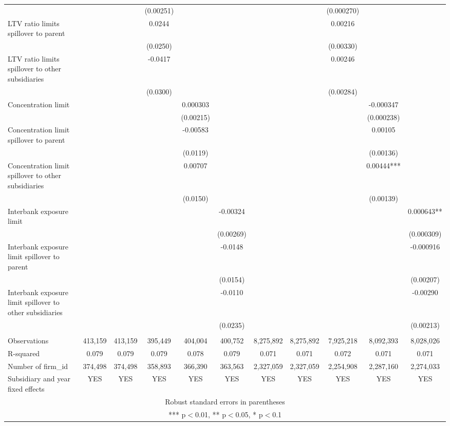 \begin{tabular}{lcccccccccc}
 &  &  & (0.00251) &  &  &  &  & (0.000270) &  &  \\
LTV ratio limits spillover to parent &  &  & 0.0244 &  &  &  &  & 0.00216 &  &  \\
 &  &  & (0.0250) &  &  &  &  & (0.00330) &  &  \\
LTV ratio limits spillover to other subsidiaries &  &  & -0.0417 &  &  &  &  & 0.00246 &  &  \\
 &  &  & (0.0300) &  &  &  &  & (0.00284) &  &  \\
Concentration limit &  &  &  & 0.000303 &  &  &  &  & -0.000347 &  \\
 &  &  &  & (0.00215) &  &  &  &  & (0.000238) &  \\
Concentration limit spillover to parent &  &  &  & -0.00583 &  &  &  &  & 0.00105 &  \\
 &  &  &  & (0.0119) &  &  &  &  & (0.00136) &  \\
Concentration limit spillover to other subsidiaries &  &  &  & 0.00707 &  &  &  &  & 0.00444*** &  \\
 &  &  &  & (0.0150) &  &  &  &  & (0.00139) &  \\
Interbank exposure limit &  &  &  &  & -0.00324 &  &  &  &  & 0.000643** \\
 &  &  &  &  & (0.00269) &  &  &  &  & (0.000309) \\
Interbank exposure limit spillover to parent &  &  &  &  & -0.0148 &  &  &  &  & -0.000916 \\
 &  &  &  &  & (0.0154) &  &  &  &  & (0.00207) \\
Interbank exposure limit spillover to other subsidiaries &  &  &  &  & -0.0110 &  &  &  &  & -0.00290 \\
 &  &  &  &  & (0.0235) &  &  &  &  & (0.00213) \\
 &  &  &  &  &  &  &  &  &  &  \\
Observations & 413,159 & 413,159 & 395,449 & 404,004 & 400,752 & 8,275,892 & 8,275,892 & 7,925,218 & 8,092,393 & 8,028,026 \\
R-squared & 0.079 & 0.079 & 0.079 & 0.078 & 0.079 & 0.071 & 0.071 & 0.072 & 0.071 & 0.071 \\
Number of firm\_id & 374,498 & 374,498 & 358,893 & 366,390 & 363,563 & 2,327,059 & 2,327,059 & 2,254,908 & 2,287,160 & 2,274,033 \\
 Subsidiary and year fixed effects & YES & YES & YES & YES & YES & YES & YES & YES & YES & YES \\ \hline
\multicolumn{11}{c}{ Robust standard errors in parentheses} \\
\multicolumn{11}{c}{ *** p$<$0.01, ** p$<$0.05, * p$<$0.1} \\
\end{tabular}
